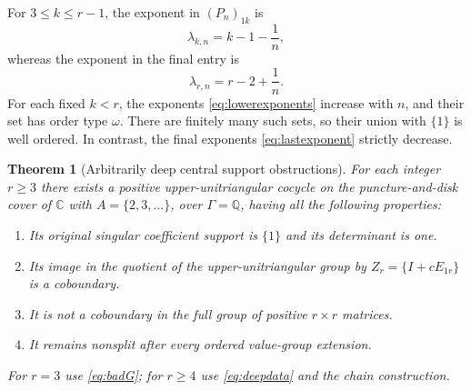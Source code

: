 \documentclass[11pt,letterpaper]{article}
\newtheorem{theorem}{Theorem}[section]
\theoremstyle{definition}
\theoremstyle{remark}
\newcommand{\C}{\mathbb C}
\newcommand{\Q}{\mathbb Q}
\numberwithin{equation}{section}
\begin{document}
For $3\leq k\leq r-1$, the exponent in $(P_n)_{1k}$ is
\begin{equation}\label{eq:lowerexponents}
 \lambda_{k,n}=k-1-\frac1n,
\end{equation}
whereas the exponent in the final entry is
\begin{equation}\label{eq:lastexponent}
 \lambda_{r,n}=r-2+\frac1n.
\end{equation}
For each fixed $k<r$, the exponents \eqref{eq:lowerexponents} increase with $n$, and their set has order type $\omega$. There are finitely many such sets, so their union with $\{1\}$ is well ordered. In contrast, the final exponents \eqref{eq:lastexponent} strictly decrease.

\begin{theorem}[Arbitrarily deep central support obstructions]\label{thm:depth}
For each integer $r\geq3$ there exists a positive upper-unitriangular cocycle on the puncture-and-disk cover of $\C$ with $A=\{2,3,\ldots\}$, over $\Gamma=\Q$, having all the following properties:
\begin{enumerate}[label=\textup{(\roman*)}]
\item Its original singular coefficient support is $\{1\}$ and its determinant is one.
\item Its image in the quotient of the upper-unitriangular group by $Z_r=\{I+cE_{1r}\}$ is a coboundary.
\item It is not a coboundary in the full group of positive $r\times r$ matrices.
\item It remains nonsplit after every ordered value-group extension.
\end{enumerate}
For $r=3$ use \eqref{eq:badG}; for $r\geq4$ use \eqref{eq:deepdata} and the chain construction.
\end{theorem}
\end{document}
